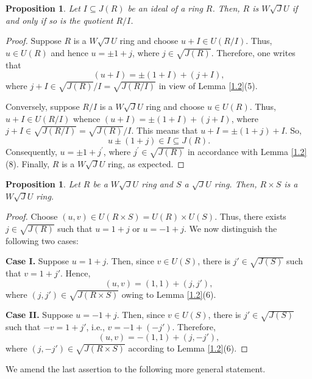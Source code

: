 \documentclass[12pt]{amsart}
\newtheorem{proposition}[theorem]{Proposition} \newtheorem{lemma}[theorem]{Lemma}
\begin{document}
\begin{proposition}\label{1} Let \(I \subseteq J(R)\) be an ideal of a ring \(R\). Then, \(R\) is $W\sqrt{J}U$
if and only if so is the quotient \(R/I\).
\end{proposition}

\begin{proof} Suppose \(R\) is a $W\sqrt{J}U$ ring and choose \(u + I \in U(R/I)\). Thus, \(u \in U(R)\) and hence \(u = \pm1 + j\), where \(j \in \sqrt{J(R)}\). Therefore, one writes that
\[(u + I) = \pm(1+I)+(j+I),\] where \(j + I \in \sqrt{J(R)}/I = \sqrt{J(R/I)}\) in view of Lemma \ref{1.2}(5).

Conversely, suppose \(R/I\) is a $W\sqrt{J}U$ ring and choose \(u \in U(R)\). Thus, \(u + I \in U(R/I)\) whence \((u + I) = \pm(1 + I) + (j + I)\), where \(j + I \in \sqrt{J(R/I)}=\sqrt{J(R)}/I \). This means that \(u + I = \pm(1 + j) + I\). So, \[u \pm(1 + j) \in I \subseteq J(R).\] Consequently, \(u = \pm1 + j^\prime\), where \(j^\prime \in \sqrt{J(R)}\) in accordance with Lemma \ref{1.2}(8). Finally, \(R\) is a $W\sqrt{J}U$ ring, as expected.
\end{proof}

\begin{proposition}\label{product} Let $R$ be a $W\sqrt{J}U$ ring and $S$ a $\sqrt{J}U$ ring. Then, $R\times S$
is a $W\sqrt{J}U$ ring.
\end{proposition}

\begin{proof} Choose \((u, v) \in U(R \times S) = U(R) \times U(S)\). Thus, there exists \( j \in \sqrt{J(R)} \) such that \( u = 1 + j \) or \( u = -1 + j \). We now distinguish the following two cases:

\medskip

\noindent\textbf{Case I.} Suppose \( u = 1 + j \). Then, since \( v \in U(S) \), there is \( j' \in
\sqrt{J(S)} \) such that \( v = 1 + j' \). Hence, \[ (u, v) = (1, 1) + (j, j'), \] where \( (j, j') \in
\sqrt{J(R \times S)} \) owing to Lemma \ref{1.2}(6).

\medskip

\noindent\textbf{Case II.} Suppose \( u = -1 + j \). Then, since \( v \in U(S) \), there is \( j' \in
\sqrt{J(S)} \) such that \( -v = 1 + j' \), i.e., \( v = -1 + (-j') \). Therefore, \[ (u, v) = -(1, 1) + (j,
-j'), \] where \( (j, -j') \in \sqrt{J(R \times S)} \) according to Lemma \ref{1.2}(6).
\end{proof}

We amend the last assertion to the following more general statement.
\end{document}
